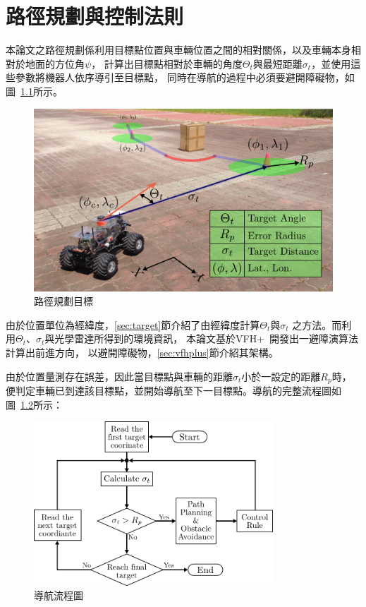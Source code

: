 \chapter{路徑規劃與控制法則}
\label{c:obstacle_avoidance}

本論文之路徑規劃係利用目標點位置與車輛位置之間的相對關係，以及車輛本身相對於地面的方位角$\psi$，
計算出目標點相對於車輛的角度$\Theta_t$與最短距離$\sigma_t$，並使用這些參數將機器人依序導引至目標點，
同時在導航的過程中必須要避開障礙物，如圖~\ref{f:path_planning}所示。
\begin{figure}
	\centering
	\includegraphics[width=\textwidth]{figures/algorithm/pathplanning}
	\caption{路徑規劃目標}
	\label{f:path_planning}
\end{figure}

由於位置單位為經緯度，\ref{sec:target}節介紹了由經緯度計算$\Theta_t$與$\sigma_t$
之方法。而利用$\Theta_t$、$\sigma_t$與光學雷達所得到的環境資訊，
本論文基於VFH+~\cite{Ulrich:1998:VFHPlus}開發出一避障演算法計算出前進方向，
以避開障礙物，\ref{sec:vfhplus}節介紹其架構。

由於位置量測存在誤差，因此當目標點與車輛的距離$\sigma_t$小於一設定的距離$R_p$時，
便判定車輛已到達該目標點，並開始導航至下一目標點。導航的完整流程圖如圖~\ref{f:navigation_flow}所示：
\begin{figure}[h!]
	\centering
	\includegraphics[width=0.8\textwidth]{figures/algorithm/navigation_flow}
	\caption{導航流程圖}
	\label{f:navigation_flow}
\end{figure}


